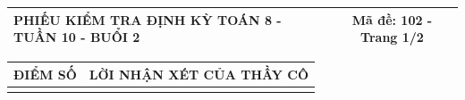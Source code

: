 \documentclass[12pt,a4paper]{article}
\begin{document}
\newpage
\noindent
\begin{tabularx}{\linewidth}{|X|c|}
\hline
\textbf{PHIẾU KIỂM TRA ĐỊNH KỲ TOÁN 8 - TUẦN 10 - BUỔI 2} & \textbf{Mã đề: 102 - Trang 1/2} \\
\hline
\end{tabularx}

\vspace{1.2mm}

\noindent
\begin{tabularx}{\linewidth}{|p{3.2cm}|X|}
\hline
\centering\textbf{ĐIỂM SỐ} & \centering\textbf{LỜI NHẬN XÉT CỦA THẦY CÔ} \tabularnewline
\hline
\rule{0pt}{1.8cm} & \tabularnewline
\hline
\end{tabularx}
\end{document}

